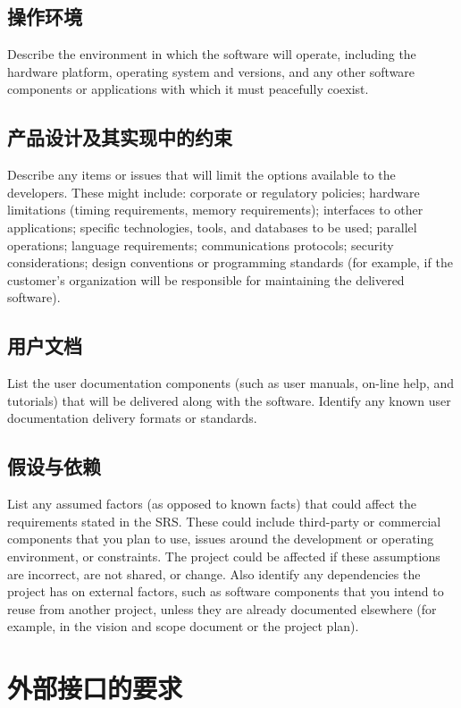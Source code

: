 \documentclass{ctexart}
\begin{document}
\subsection{操作环境}
Describe the environment in which the software will operate, including the 
hardware platform, operating system and versions, and any other software 
components or applications with which it must peacefully coexist.


\subsection{产品设计及其实现中的约束}
Describe any items or issues that will limit the options available to the 
developers. These might include: corporate or regulatory policies; hardware 
limitations (timing requirements, memory requirements); interfaces to other 
applications; specific technologies, tools, and databases to be used; parallel 
operations; language requirements; communications protocols; security 
considerations; design conventions or programming standards (for example, if the 
customer's organization will be responsible for maintaining the delivered 
software).


\subsection{用户文档}
List the user documentation components (such as user manuals, on-line help, 
and tutorials) that will be delivered along with the software. Identify any 
known user documentation delivery formats or standards.


\subsection{假设与依赖}
List any assumed factors (as opposed to known facts) that could affect the 
requirements stated in the SRS. These could include third-party or commercial 
components that you plan to use, issues around the development or operating 
environment, or constraints. The project could be affected if these assumptions 
are incorrect, are not shared, or change. Also identify any dependencies the 
project has on external factors, such as software components that you intend to 
reuse from another project, unless they are already documented elsewhere (for 
example, in the vision and scope document or the project plan).



\section{外部接口的要求}\label{S:external-interface-requirements}
\end{document}
